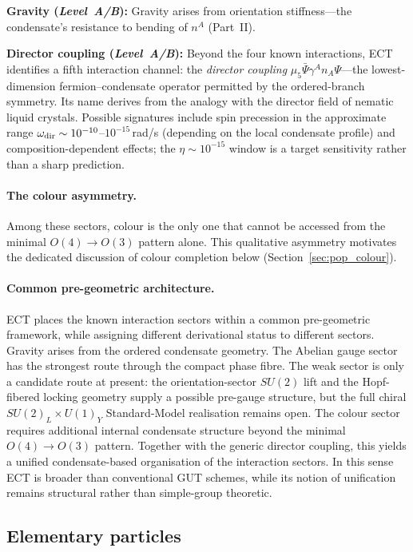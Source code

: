 \documentclass[11pt,a4paper]{article}
\begin{document}
\textbf{Gravity (\emph{Level~A/B}):} Gravity arises from orientation stiffness---the condensate's resistance to bending of $n^A$ (Part~II).

\textbf{Director coupling (\emph{Level~A/B}):} Beyond the four known interactions, ECT identifies a fifth interaction channel: the \emph{director coupling} $\mu_5 \bar\Psi \gamma^A n_A \Psi$---the lowest-dimension fermion--condensate operator permitted by the ordered-branch symmetry. Its name derives from the analogy with the director field of nematic liquid crystals. Possible signatures include spin precession in the approximate range $\omega_{\rm dir} \sim 10^{-10}$--$10^{-15}$\,rad/s (depending on the local condensate profile) and composition-dependent effects; the $\eta \sim 10^{-15}$ window is a target sensitivity rather than a sharp prediction.

\paragraph{The colour asymmetry.}
Among these sectors, colour is the only one that cannot be accessed from the minimal $O(4)\to O(3)$ pattern alone. This qualitative asymmetry motivates the dedicated discussion of colour completion below (Section~\ref{sec:pop_colour}).

\paragraph{Common pre-geometric architecture.}
ECT places the known interaction sectors within a common pre-geometric framework, while assigning different derivational status to different sectors. Gravity arises from the ordered condensate geometry. The Abelian gauge sector has the strongest route through the compact phase fibre. The weak sector is only a candidate route at present: the orientation-sector $SU(2)$ lift and the Hopf-fibered locking geometry supply a possible pre-gauge structure, but the full chiral $SU(2)_L\times U(1)_Y$ Standard-Model realisation remains open. The colour sector requires additional internal condensate structure beyond the minimal $O(4)\to O(3)$ pattern. Together with the generic director coupling, this yields a unified condensate-based organisation of the interaction sectors. In this sense ECT is broader than conventional GUT schemes, while its notion of unification remains structural rather than simple-group theoretic.

\subsection{Elementary particles}
\end{document}
